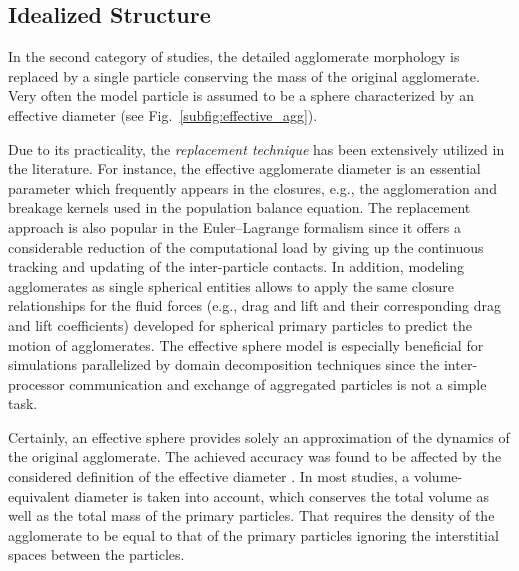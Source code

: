 \subsection{Idealized Structure \label{sec:idealizied_stru}}

In the second category of studies, the detailed agglomerate morphology
is replaced by a single particle conserving the mass of the original
agglomerate. Very often the model particle is assumed to be a sphere
characterized by an effective diameter (see
Fig.~\ref{subfig:effective_agg}).

Due to its practicality, the
\emph{replacement technique} has been extensively utilized in the
literature. For instance, the effective agglomerate diameter is an
essential parameter which frequently appears in the closures, e.g.,
the agglomeration and breakage kernels used in the population balance
equation. The replacement approach is also popular in the
Euler--Lagrange formalism
\citep[e.g.,][]{breuer2015a,kosinski2011,ho2002,chun2005coagulation,van2020analysis}
since it offers a considerable reduction of the computational load by
giving up the continuous tracking and updating of the inter-particle
contacts. In addition, modeling agglomerates as single spherical
entities allows to apply the same closure relationships for the fluid
forces (e.g., drag and lift and their corresponding drag and lift
coefficients) developed for spherical primary particles to predict the
motion of agglomerates. The effective sphere model is especially
beneficial for simulations parallelized by domain decomposition
techniques since the inter-processor communication and exchange of
aggregated particles is not a simple task. \newline

Certainly, an effective sphere provides solely an approximation of the
dynamics of the original agglomerate.  The achieved accuracy was found
to be affected by the considered definition of the effective diameter
\citep{dietzel2016application}. In most studies, a volume-equivalent
diameter is taken into account, which conserves the total volume as
well as the total mass of the primary particles.  That requires the
density of the agglomerate to be equal to that of the primary
particles ignoring the interstitial spaces between the particles.

